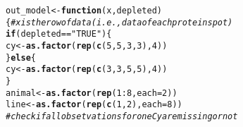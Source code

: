\documentclass{article}\usepackage[]{graphicx}\usepackage[]{color}
\makeatletter
\newcommand{\hlnum}[1]{\textcolor[rgb]{0.686,0.059,0.569}{#1}}%
\newcommand{\hlstr}[1]{\textcolor[rgb]{0.192,0.494,0.8}{#1}}%
\newcommand{\hlcom}[1]{\textcolor[rgb]{0.678,0.584,0.686}{\textit{#1}}}%
\newcommand{\hlopt}[1]{\textcolor[rgb]{0,0,0}{#1}}%
\newcommand{\hlstd}[1]{\textcolor[rgb]{0.345,0.345,0.345}{#1}}%
\newcommand{\hlkwa}[1]{\textcolor[rgb]{0.161,0.373,0.58}{\textbf{#1}}}%
\newcommand{\hlkwb}[1]{\textcolor[rgb]{0.69,0.353,0.396}{#1}}%
\newcommand{\hlkwc}[1]{\textcolor[rgb]{0.333,0.667,0.333}{#1}}%
\newcommand{\hlkwd}[1]{\textcolor[rgb]{0.737,0.353,0.396}{\textbf{#1}}}%
\newenvironment{kframe}{%
 \def\at@end@of@kframe{}%
 \ifinner\ifhmode%
  \def\at@end@of@kframe{\end{minipage}}%
  \begin{minipage}{\columnwidth}%
 \fi\fi%
 \def\FrameCommand##1{\hskip\@totalleftmargin \hskip-\fboxsep
 \colorbox{shadecolor}{##1}\hskip-\fboxsep
     \hskip-\linewidth \hskip-\@totalleftmargin \hskip\columnwidth}%
 \MakeFramed {\advance\hsize-\width
   \@totalleftmargin\z@ \linewidth\hsize
   \@setminipage}}%
 {\par\unskip\endMakeFramed%
 \at@end@of@kframe}
\newenvironment{knitrout}{}{} %
\makeatother
\begin{document}
\begin{knitrout}
\color{fgcolor}\begin{kframe}
\begin{alltt}
\hlstd{out_model} \hlkwb{<-} \hlkwa{function}\hlstd{(}\hlkwc{x}\hlstd{,} \hlkwc{depleted}\hlstd{)\{} \hlcom{# x is the row of data (i.e., data of each protein spot)}
  \hlkwa{if} \hlstd{(depleted} \hlopt{==} \hlstr{"TRUE"}\hlstd{)\{}
    \hlstd{cy} \hlkwb{<-} \hlkwd{as.factor}\hlstd{(}\hlkwd{rep}\hlstd{(}\hlkwd{c}\hlstd{(}\hlnum{5}\hlstd{,}\hlnum{5}\hlstd{,}\hlnum{3}\hlstd{,}\hlnum{3}\hlstd{),}\hlnum{4}\hlstd{))}
  \hlstd{\}} \hlkwa{else} \hlstd{\{}
    \hlstd{cy} \hlkwb{<-} \hlkwd{as.factor}\hlstd{(}\hlkwd{rep}\hlstd{(}\hlkwd{c}\hlstd{(}\hlnum{3}\hlstd{,}\hlnum{3}\hlstd{,}\hlnum{5}\hlstd{,}\hlnum{5}\hlstd{),}\hlnum{4}\hlstd{))}
  \hlstd{\}}
  \hlstd{animal} \hlkwb{<-} \hlkwd{as.factor}\hlstd{(}\hlkwd{rep}\hlstd{(}\hlnum{1}\hlopt{:}\hlnum{8}\hlstd{,} \hlkwc{each} \hlstd{=} \hlnum{2}\hlstd{))}
  \hlstd{line} \hlkwb{<-} \hlkwd{as.factor}\hlstd{(}\hlkwd{rep}\hlstd{(}\hlkwd{c}\hlstd{(}\hlnum{1}\hlstd{,}\hlnum{2}\hlstd{),} \hlkwc{each} \hlstd{=} \hlnum{8}\hlstd{))}
  \hlcom{# check if all obsetvations for one Cy are missing or not}


\end{alltt}
\end{kframe}
\end{knitrout}
\end{document}
